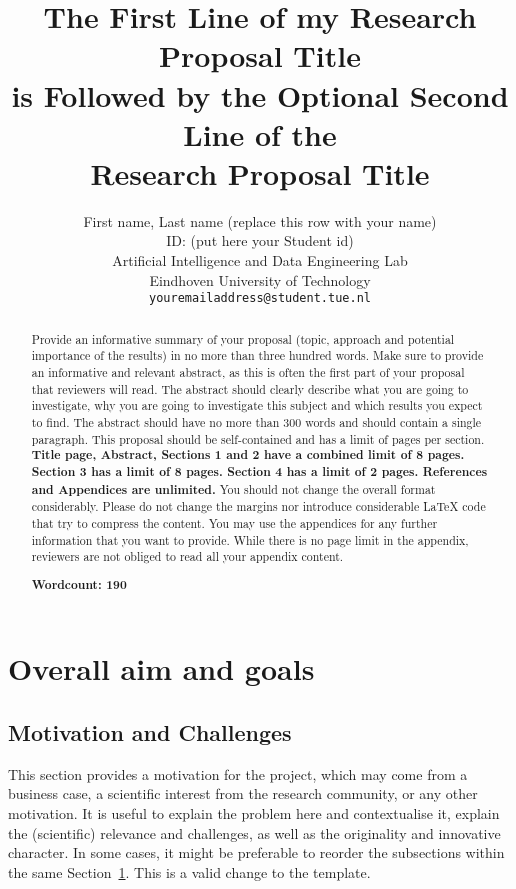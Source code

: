 \documentclass{article}
\title{The First Line of my Research Proposal Title\\is Followed by the Optional Second Line of the\\Research Proposal Title}
\author{
 First name, Last name (replace this row with your name) \\
 ID: (put here your Student id)\\
 Artificial Intelligence and Data Engineering Lab\\
Eindhoven University of Technology\\
  \texttt{youremailaddress@student.tue.nl} \\
}
\begin{document}
\maketitle
\begin{abstract}
Provide an informative summary of your proposal (topic, approach and potential importance of the results) in no more than three hundred words. 
%
Make sure to provide an informative and relevant abstract, as this is often the first part of your proposal that reviewers will read. The abstract should clearly describe what you are going to investigate, why you are going to investigate this subject and which results you expect to find. 
%
The abstract should have no more than 300 words and should contain a single paragraph.
%
This proposal should be self-contained and has a limit of pages per section. \textbf{Title page, Abstract, Sections 1 and 2 have a combined limit of 8 pages. Section 3 has a limit of 8 pages. Section 4 has a limit of 2 pages. References and Appendices are unlimited.} You should not change the overall format considerably. Please do not change the margins nor introduce considerable LaTeX code that try to compress the content. You may use the appendices for any further information that you want to provide. While there is no page limit in the appendix, reviewers are not obliged to read all your appendix content.

\noindent\textbf{Wordcount: 190} 
\end{abstract}

\section{Overall aim and goals}
\label{sec:goals}
\subsection{Motivation and Challenges}

This section provides a motivation for the project, which may come from a business case, a scientific interest from the research community, or any other motivation. It is useful to explain the problem here and contextualise it, explain the (scientific) relevance and challenges, as well as the originality and innovative character. In some cases, it might be preferable to reorder the subsections within the same Section~\ref{sec:goals}. This is a valid change to the template.
\end{document}
